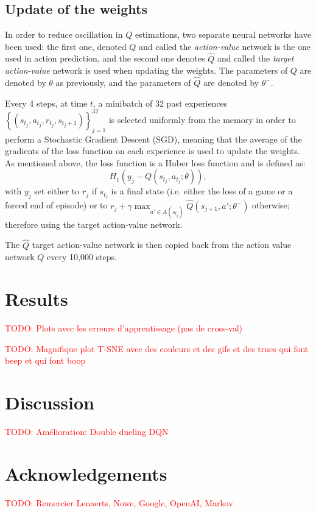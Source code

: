 \documentclass[letterpaper]{article}
\newcommand\todo[1]{\textcolor{red}{TODO: #1}}
\begin{document}
\subsection{Update of the weights}

In order to reduce oscillation in $Q$ estimations, two separate neural networks have been used: the first one, denoted $Q$ and called the \textit{action-value}
network is the one used in action prediction, and the second one denotes $\hat Q$ and called the \textit{target action-value} network is used when
updating the weights. The parameters of $Q$ are denoted by $\theta$ as previously, and the parameters of $\hat Q$ are denoted by $\theta^-$.

Every 4 steps, at time $t$, a minibatch of 32 past experiences $\left\{(s_{t_j}, a_{t_j}, r_{t_j}, s_{t_j+1})\right\}_{j=1}^{32}$ is selected uniformly from the
memory in order to perform a Stochastic Gradient Descent (SGD), meaning that the average of the gradients of the loss function on each experience is used to update
the weights. As mentioned above, the loss function is a Huber loss function and is defined as:
\begin{equation}
	H_1\left(y_j - Q(s_{t_j}, a_{t_j}; \theta)\right),
\end{equation}
with $y_j$ set either to $r_j$ if $s_{t_j}$ is a final state (i.e. either the loss of a game or a forced end of episode) or to
$r_j + \gamma\max_{a' \in A(s_{t_j})}\hat Q(s_{j+1}, a'; \theta^-)$ otherwise; therefore using the target action-value network.

The $\hat Q$ target action-value network is then copied back from the action value network $Q$ every 10,000 steps.

\section{Results}

  \todo{Plots avec les erreurs d'apprentissage (pas de cross-val)}

  \todo{Magnifique plot T-SNE avec des couleurs et des gifs et des trucs qui font beep et qui font boop}~\citep{wattenberg2016how}

\section{Discussion}

  \todo{Amélioration: Double dueling DQN}~\citep{DBLP:journals/corr/WangFL15}

\section{Acknowledgements}

  \todo{Remercier Lenaerts, Nowe, Google, OpenAI, Markov}

\footnotesize


\end{document}
